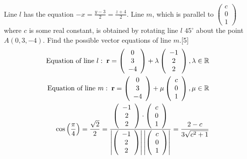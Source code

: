 \documentclass[12pt, a4 paper]{article}
\begin{document}
\begin{outline}[enumerate]
																
					\1 Line $l$ has the equation $ - x = \frac{{y - 3}}{2} = \frac{{z + 4}}{2}$. Line $m$, which is parallel to $\left( {\begin{array}{*{20}{c}}c\\0\\1\end{array}} \right)$ where $c$ is some real constant, is obtained by rotating line $l$ $45^\circ $ about the point $A(0,3, - 4)$. Find the possible vector equations of line $m$.\hfill[5]
					\color{blue}
					\begin{align*}
						{\textrm{Equation of line }}l:\;{\bf{r}} = \left( {\begin{array}{*{20}{c}}0 \\3\\{ - 4}\end{array}} \right) + \lambda \left( {\begin{array}{*{20}{c}}{ - 1}\\2\\2\end{array}} \right),\lambda  \in \mathbb{R}\\{\textrm{Equation of line }}m:\;{\bf{r}} = \left( {\begin{array}{*{20}{c}}0\\3\\{ - 4}\end{array}} \right) + \mu \left( {\begin{array}{*{20}{c}}c\\0\\1\end{array}} \right),\mu  \in \mathbb{R}\\\cos \left( {\frac{\pi }{4}} \right) = \frac{{\sqrt 2 }}{2} = \frac{{\left( {\begin{array}{*{20}{c}}{ - 1}\\2\\2\end{array}} \right) \cdot \left( {\begin{array}{*{20}{c}}c\\0\\1\end{array}} \right)}}{{\left| {\left( {\begin{array}{*{20}{c}}{ - 1}\\2\\2\end{array}} \right)} \right|\left| {\left( {\begin{array}{*{20}{c}}c\\0\\1\end{array}} \right)} \right|}}= \frac{{2 - c}}{{3\sqrt {{c^2} + 1} }}

\end{align*}
\end{outline}
\end{document}
